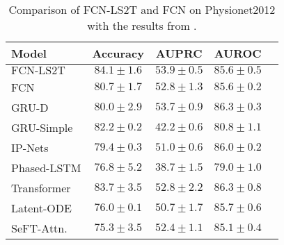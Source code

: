 \documentclass{article} \usepackage{iclr2021_conference,times}
\theoremstyle{plain}
\theoremstyle{definition}
\begin{document}
\begin{wraptable}{r}{0.55\textwidth}
	\vspace{-17.5pt}
	\caption{Comparison of FCN-LS2T and FCN on {\sc Physionet2012} with the results from \citet{horn2020set}.}
	\label{table:mort_pred}
	\vspace{-10pt}
	\begin{center}
	\begin{scriptsize}
	\begin{sc}
		\begin{tabular}{lcccc}
			\toprule
			Model & Accuracy & AUPRC & AUROC \\
			\midrule
			$\text{FCN-LS2T}$ & $\mathbf{84.1 \pm 1.6}$ & $\mathbf{53.9 \pm 0.5}$ & $85.6 \pm 0.5$ \\ 
			FCN & $80.7 \pm 1.7$ & $52.8 \pm 1.3$ & $85.6 \pm 0.2$ \\
			GRU-D & $80.0 \pm 2.9$ & $\mathit{53.7 \pm 0.9}$ & $\mathbf{86.3 \pm 0.3}$ \\
			GRU-Simple & $82.2 \pm 0.2$ & $42.2 \pm 0.6$ & $80.8 \pm 1.1$ \\
			IP-Nets & $79.4 \pm 0.3$ & $51.0 \pm 0.6$ & $\mathit{86.0 \pm 0.2}$ \\
			Phased-LSTM & $76.8 \pm 5.2$ & $38.7 \pm 1.5$ & $79.0 \pm 1.0$ \\
			Transformer & $\mathit{83.7 \pm 3.5}$ & $52.8 \pm 2.2$ & $\mathbf{86.3 \pm 0.8}$ \\
			Latent-ODE & $76.0 \pm 0.1$ & $50.7 \pm 1.7$ & $85.7 \pm 0.6$ \\
			SeFT-Attn. & $75.3 \pm 3.5$ & $52.4 \pm 1.1$ & $85.1 \pm 0.4$ \\
			\bottomrule
		\end{tabular}
	\end{sc}
	\end{scriptsize}
	\end{center}
\vspace{-15pt}
\end{wraptable}
\end{document}
